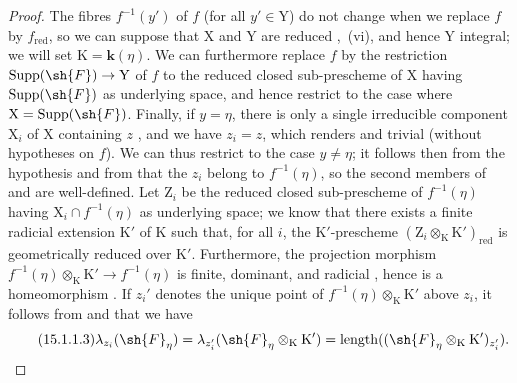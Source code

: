 \begin{proof}
\label{IV.15.1.1-proof}
The fibres $f^{-1}(y')$ of $f$ (for all $y'\in\mathrm{Y}$) do not change when we replace $f$ by $f_\mathrm{red}$, so we can suppose that $\mathrm{X}$ and $\mathrm{Y}$ are reduced ,~(vi), and hence $\mathrm{Y}$ integral; we will set $\mathrm{K}=\mathbf{k}(\eta)$.
We can furthermore replace $f$ by the restriction $\operatorname{Supp}(\sh{F})\to\mathrm{Y}$ of $f$ to the reduced closed sub-prescheme of $\mathrm{X}$ having $\operatorname{Supp}(\sh{F})$ as underlying space, and hence restrict to the case where $\mathrm{X}=\operatorname{Supp}(\sh{F})$.
Finally, if $y=\eta$, there is only a single irreducible component $\mathrm{X}_i$ of $\mathrm{X}$ containing $z$ , and we have $z_i=z$, which renders  and  trivial (without hypotheses on $f$).
We can thus restrict to the case $y\neq\eta$; it follows then from the hypothesis and from  that the $z_i$ belong to $f^{-1}(\eta)$, so the second members of  and  are well-defined.
Let $\mathrm{Z}_i$ be the reduced closed sub-prescheme of $f^{-1}(\eta)$ having $\mathrm{X}_i\cap f^{-1}(\eta)$ as underlying space; we know  that there exists a finite radicial extension $\mathrm{K}'$ of $\mathrm{K}$ such that, for all $i$, the $\mathrm{K}'$-prescheme $(\mathrm{Z}_i\otimes_\mathrm{K}\mathrm{K}')_\mathrm{red}$ is geometrically reduced over $\mathrm{K}'$.
Furthermore, the projection morphism $f^{-1}(\eta)\otimes_\mathrm{K}\mathrm{K}'\to f^{-1}(\eta)$ is finite, dominant, and radicial , hence is a homeomorphism .
If $z_i'$ denotes the unique point of $f^{-1}(\eta)\otimes_\mathrm{K}\mathrm{K}'$ above $z_i$, it follows from  and  that we have
\[
\tag{15.1.1.3}
\label{IV.15.1.1.3}
  \lambda_{z_i}(\sh{F}_\eta)=\lambda_{z_i'}(\sh{F}_\eta\otimes_\mathrm{K}\mathrm{K}')=\operatorname{length}((\sh{F}_\eta\otimes_\mathrm{K}\mathrm{K}')_{z_i'}).
\]


\end{proof}
